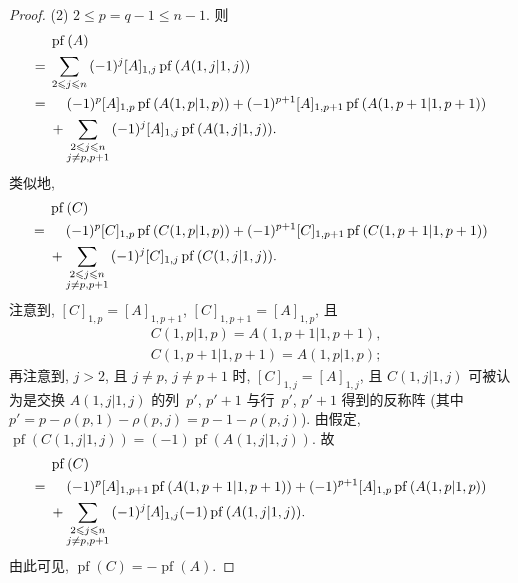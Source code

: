\begin{proof}
    (2)
    \(2 \leq p = q - 1 \leq n - 1\).
    则
    \begin{align*}
             &
        \operatorname{pf} {(A)}
        \\
        = {} &
        \sum_{2 \leq j \leq n}
        {
        (-1)^{j} [A]_{1,j}
        \operatorname{pf} {(A({1,j}|{1,j}))}
        }
        \\
        = {} &
        \hphantom{{} + {}}
        (-1)^{p} [A]_{1,p}
        \operatorname{pf} {(A({1,p}|{1,p}))}
        +
        (-1)^{p+1} [A]_{1,p+1}
        \operatorname{pf} {(A({1,p+1}|{1,p+1}))}
        \\
             &
        +
        \sum_{\substack{2 \leq j \leq n \\ j \neq p, p+1}}
        {
        (-1)^{j} [A]_{1,j}
        \operatorname{pf} {(A({1,j}|{1,j}))}
        }.
    \end{align*}
    类似地,
    \begin{align*}
             &
        \operatorname{pf} {(C)}
        \\
        = {} &
        \hphantom{{} + {}}
        (-1)^{p} [C]_{1,p}
        \operatorname{pf} {(C({1,p}|{1,p}))}
        +
        (-1)^{p+1} [C]_{1,p+1}
        \operatorname{pf} {(C({1,p+1}|{1,p+1}))}
        \\
             &
        +
        \sum_{\substack{2 \leq j \leq n \\ j \neq p, p+1}}
        {
        (-1)^{j} [C]_{1,j}
        \operatorname{pf} {(C({1,j}|{1,j}))}
        }.
    \end{align*}
    注意到,
    \([C]_{1,p} = [A]_{1,p+1}\),
    \([C]_{1,p+1} = [A]_{1,p}\),
    且
    \begin{align*}
         & C({1,p}|{1,p}) = A({1,p+1}|{1,p+1}), \\
         & C({1,p+1}|{1,p+1}) = A({1,p}|{1,p});
    \end{align*}
    再注意到, \(j > 2\), 且 \(j \neq p\), \(j \neq p+1\) 时,
    \([C]_{1,j} = [A]_{1,j}\),
    且 \(C({1,j}|{1,j})\)
    可被认为是交换
    \(A({1,j}|{1,j})\) 的列~\(p'\), \(p'+1\)
    与行~\(p'\), \(p'+1\) 得到的反称阵
    (其中 \(p' = p - \rho (p, 1) - \rho(p, j)
    = p - 1 - \rho(p, j)\)).
    由假定,
    \(
    \operatorname{pf} {(C({1,j}|{1,j}))}
    = (-1) \operatorname{pf} {(A({1,j}|{1,j}))}
    \).
    故
    \begin{align*}
             &
        \operatorname{pf} {(C)}
        \\
        = {} &
        \hphantom{{} + {}}
        (-1)^{p} [A]_{1,p+1}
        \operatorname{pf} {(A({1,p+1}|{1,p+1}))}
        +
        (-1)^{p+1} [A]_{1,p}
        \operatorname{pf} {(A({1,p}|{1,p}))}
        \\
             &
        +
        \sum_{\substack{2 \leq j \leq n \\ j \neq p, p+1}}
        {
        (-1)^{j} [A]_{1,j}
        (-1) \operatorname{pf} {(A({1,j}|{1,j}))}
        }.
    \end{align*}
    由此可见, \(\operatorname{pf} {(C)}
    = -\operatorname{pf} {(A)}\).


\end{proof}
